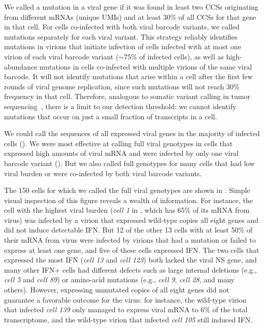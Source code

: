 \documentclass[9pt,lineno]{elife}
\begin{document}
We called a mutation in a viral gene if it was found in least two CCSs originating from different mRNAs (unique UMIs) and at least 30\% of all CCSs for that gene in that cell.
For cells co-infected with both viral barcode variants, we called mutations separately for each viral variant.
This strategy reliably identifies mutations in virions that initiate infection of cells infected with at most one virion of each viral barcode variant ($\sim$75\% of infected cells), as well as high-abundance mutations in cells co-infected with multiple virions of the same viral barcode.
It will not identify mutations that arise within a cell after the first few rounds of viral genome replication, since such mutations will not reach 30\% frequency in that cell.
Therefore, analogous to somatic variant calling in tumor sequencing~\citep{xu2014comparison, cibulskis2013sensitive}, there is a limit to our detection threshold: we cannot identify mutations that occur on just a small fraction of transcripts in a cell. 

We could call the sequences of all expressed viral genes in the majority of infected cells ().
We were most effective at calling full viral genotypes in cells that expressed high amounts of viral mRNA and were infected by only one viral barcode variant ().
But we also called full genotypes for many cells that had low viral burden or were co-infected by both viral barcode variants.

The 150 cells for which we called the full viral genotypes are shown in .
Simple visual inspection of this figure reveals a wealth of information.
For instance, the cell with the highest viral burden (\textit{cell 1} in , which has 65\% of its mRNA from virus) was infected by a virion that expressed wild-type copies all eight genes and did not induce detectable IFN.
But 12 of the other 13 cells with at least 50\% of their mRNA from virus were infected by virions that had a mutation or failed to express at least one gene, and five of these cells expressed IFN.
The two cells that expressed the most IFN (\textit{cell 13} and \textit{cell 123}) both lacked the viral NS gene, and many other IFN+ cells had different defects such as large internal deletions (e.g., \textit{cell 5} and \textit{cell 89}) or amino-acid mutations (e.g., \textit{cell 9}, \textit{cell 28}, and many others).
However, expressing unmutated copies of all eight genes did not guarantee a favorable outcome for the virus: for instance, the wild-type virion that infected \textit{cell 139} only managed to express viral mRNA to 6\% of the total transcriptome, and the wild-type virion that infected \textit{cell 105} still induced IFN.
\end{document}
